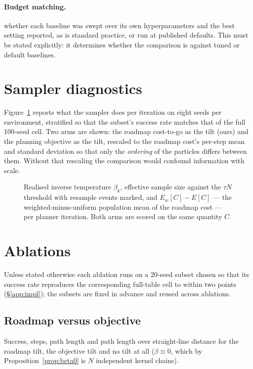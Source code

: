 \paragraph{Budget matching.} \tbd{} whether each baseline was swept over its own
hyperparameters and the best setting reported, as is standard practice, or run
at published defaults. This must be stated explicitly: it determines whether the
comparison is against tuned or default baselines.

\section{Sampler diagnostics}
\label{app:diag}

Figure~\ref{fig:diag} reports what the sampler does per iteration on eight seeds
per environment, stratified so that the subset's success rate matches that of
the full 100-seed cell. Two arms are shown: the roadmap cost-to-go as the tilt
(ours) and the planning objective as the tilt, rescaled to the roadmap cost's
per-step mean and standard deviation so that only the \emph{ordering} of the
particles differs between them. Without that rescaling the comparison would
confound information with scale.

\begin{figure}[h]
  \centering
  \tbd
  \caption{Realised inverse temperature $\beta_k$, effective sample size against
  the $\tau N$ threshold with resample events marked, and
  $E_w[C]-E[C]$ --- the weighted-minus-uniform population mean of the roadmap
  cost --- per planner iteration. Both arms are scored on the same quantity
  $C$.}
  \label{fig:diag}
\end{figure}

\section{Ablations}
\label{app:ablations}

Unless stated otherwise each ablation runs on a 20-seed subset chosen so that
its success rate reproduces the corresponding full-table cell to within two
points (\S\ref{app:impl}); the subsets are fixed in advance and reused across
ablations.

\subsection{Roadmap versus objective}
\tbd{} Success, steps, path length and path length over straight-line distance
for the roadmap tilt, the objective tilt and no tilt at all ($\beta\equiv 0$, which
by Proposition~\ref{prop:beta0} is $N$ independent kernel chains).

